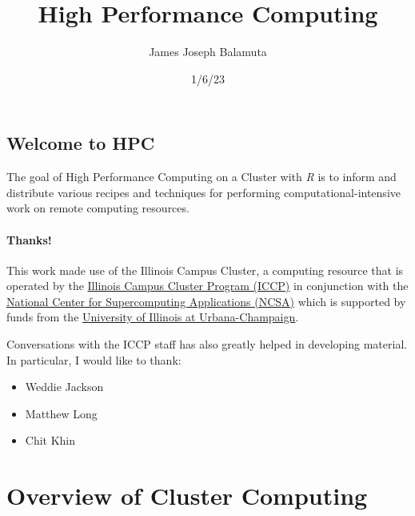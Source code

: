 \documentclass[
  letterpaper,
  DIV=11,
  numbers=noendperiod]{scrreport}
\title{High Performance Computing}
\author{James Joseph Balamuta}
\date{1/6/23}
\providecommand{\tightlist}{%
  \setlength{\itemsep}{0pt}\setlength{\parskip}{0pt}}\usepackage{longtable,booktabs,array}
\renewcommand*\contentsname{Table of contents}
\newcommand\contentsname{Table of contents}
\begin{document}
\maketitle
\ifdefined\Shaded\renewenvironment{Shaded}{\begin{tcolorbox}[borderline west={3pt}{0pt}{shadecolor}, frame hidden, interior hidden, sharp corners, breakable, boxrule=0pt, enhanced]}{\end{tcolorbox}}\fi

\renewcommand*\contentsname{Table of contents}
{
\hypersetup{linkcolor=}
\setcounter{tocdepth}{2}
\tableofcontents
}

\hypertarget{welcome-to-hpc}{%
\chapter{Welcome to HPC}\label{welcome-to-hpc}}

The goal of High Performance Computing on a Cluster with \emph{R} is to
inform and distribute various recipes and techniques for performing
computational-intensive work on remote computing resources.

\hypertarget{thanks}{%
\subsection{Thanks!}\label{thanks}}

This work made use of the Illinois Campus Cluster, a computing resource
that is operated by the
\href{https://campuscluster.illinois.edu/}{Illinois Campus Cluster
Program (ICCP)} in conjunction with the
\href{https://ncsa.illinois.edu}{National Center for Supercomputing
Applications (NCSA)} which is supported by funds from the
\href{https://illinois.edu}{University of Illinois at Urbana-Champaign}.

Conversations with the ICCP staff has also greatly helped in developing
material. In particular, I would like to thank:

\begin{itemize}
\tightlist
\item
  Weddie Jackson
\item
  Matthew Long
\item
  Chit Khin
\end{itemize}

\part{Overview of Cluster Computing}
\end{document}
